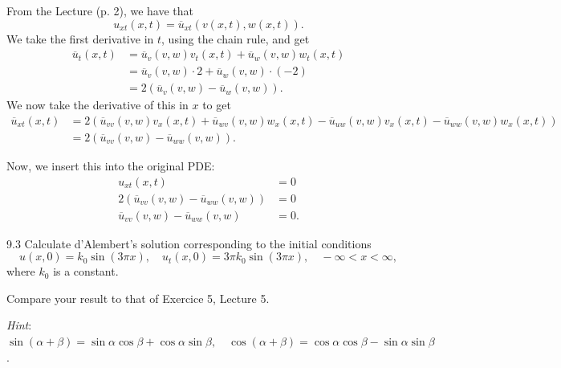 \begin{derivation}
  From the Lecture (p. 2), we have that
  \begin{equation*}
    u_{xt}(x,t) = \overline{u}_{xt}(v(x,t), w(x,t))
  .\end{equation*}
  We take the first derivative in $t$, using the chain rule, and get
  \begin{align*}
    \overline{u}_{t}(x,t) &= \overline{u}_v(v,w) v_t(x,t) + \overline{u}_w(v,w) w_t(x,t) \\
    &= \overline{u}_v(v,w) \cdot 2 + \overline{u}_w(v,w) \cdot (-2) \\
    &= 2 \left( \overline{u}_v (v,w) - \overline{u}_w(v,w) \right)
  .\end{align*}
  We now take the derivative of this in $x$ to get
  \begin{align*}
  \overline{u}_{xt}(x,t) &= 2 \left( \overline{u}_{vv}(v,w) v_x(x,t) + \overline{u}_{wv}(v,w)w_x(x,t) - \overline{u}_{uw}(v,w) v_x(x,t) - \overline{u}_{ww}(v,w) w_x(x,t) \right) \\
    &= 2 \left( \overline{u}_{vv}(v,w) - \overline{u}_{ww}(v,w) \right)
  .\end{align*}

  Now, we insert this into the original PDE:
  \begin{align*}
    u_{xt}(x,t) &= 0 \\
    2 \left( \overline{u}_{vv}(v,w) - \overline{u}_{ww}(v,w) \right) &= 0 \\
    \overline{u}_{vv}(v,w) - \overline{u}_{ww}(v,w) &= 0
  .\end{align*}
\end{derivation}


\begin{problem}{9.3}
  Calculate d'Alembert's solution corresponding to the initial conditions
  \[ 
  u(x,0) = k_0 \sin \left( 3 \pi x \right), \quad u_t (x,0) = 3 \pi k_0 \sin \left( 3 \pi x \right), \quad - \infty < x < \infty
  ,\]
  where $k_0$ is a constant.

  Compare your result to that of Exercice 5, Lecture 5.

  \textit{Hint}: $\sin \left( \alpha + \beta \right) = \sin \alpha \cos \beta + \cos \alpha \sin \beta, \quad \cos(\alpha + \beta) = \cos \alpha \cos \beta - \sin \alpha \sin \beta$.
\end{problem}

